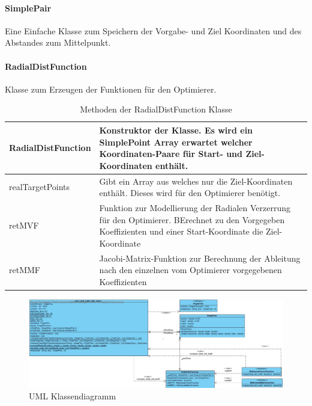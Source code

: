 \paragraph{SimplePair}
Eine Einfache Klasse zum Speichern der Vorgabe- und Ziel Koordinaten und des Abstandes zum Mittelpunkt.

\paragraph{RadialDistFunction}
Klasse zum Erzeugen der Funktionen für den Optimierer.

\begin{table}[H]
\begin{tabular}{p{} | p{}} 
RadialDistFunction & Konstruktor der Klasse. Es wird ein SimplePoint Array erwartet welcher Koordinaten-Paare für Start- und Ziel-Koordinaten enthält.\\ \hline
realTargetPoints & Gibt ein Array aus welches nur die Ziel-Koordinaten enthält. Dieses wird für den Optimierer benötigt.\\ \hline
retMVF & Funktion zur Modellierung der Radialen Verzerrung für den Optimierer. BErechnet zu den Vorgegeben Koeffizienten und einer Start-Koordinate die Ziel-Koordinate\\ \hline
retMMF & Jacobi-Matrix-Funktion zur Berechnung der Ableitung nach den einzelnen vom Optimierer vorgegebenen Koeffizienten \\ 
\end{tabular}
\caption{Methoden der RadialDistFunction Klasse}
\end{table}

\begin{figure}[H]
\center
\includegraphics[width=\textwidth]{Images/UML.JPG}
\caption{UML Klassendiagramm}
\label{img:UML}
\end{figure}

\newpage
